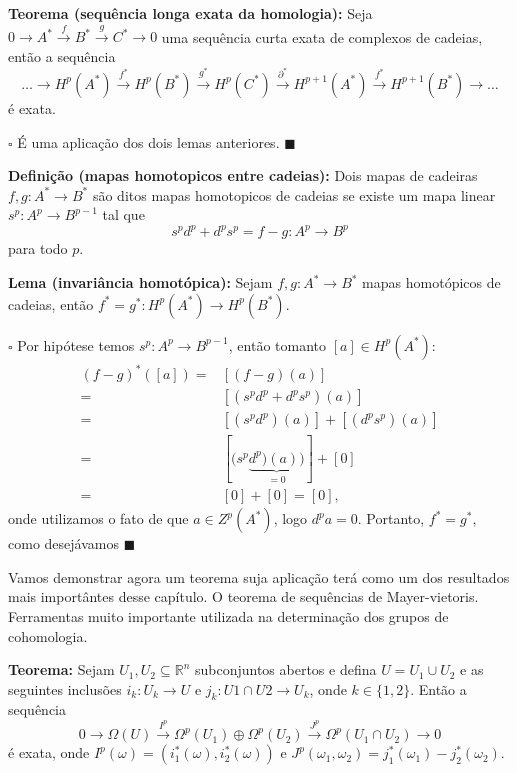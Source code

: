 \documentclass{article}
\begin{document}
	\textbf{Teorema (sequência longa exata da homologia):} Seja $0 \to A^{*} \xrightarrow{f} B^{*} \xrightarrow{g} C^{*} \to 0$ uma sequência curta exata de complexos de cadeias, então a sequência $$\dots \to H^{p}(A^{*}) \xrightarrow{f^{*}} H^{p}(B^{*}) \xrightarrow{g^{*}} H^{p}(C^{*}) \xrightarrow{\partial^{*}} H^{p+1}(A^{*}) \xrightarrow{f^{*}} H^{p+1}(B^{*}) \to \dots$$
	é exata.
	
	$\square$ É uma aplicação dos dois lemas anteriores. $\blacksquare$
	
	\textbf{Definição (mapas homotopicos entre cadeias):} Dois mapas de cadeiras $f,g : A^{*} \to B^{*}$ são ditos mapas homotopicos de cadeias se existe um mapa linear $s^{p}: A^{p} \to B^{p-1}$ tal que
	$$
	s^{p}d^{p} + d^{p}s^{p} = f-g : A^{p} \to B^{p}
	$$
	para todo $p$.
	
	\textbf{Lema (invariância homotópica):} Sejam $f,g : A^{*} \to B^{*}$ mapas homotópicos de cadeias, então $f^{*} = g^{*}: H^{p}(A^{*}) \to H^{p}(B^{*})$.
	
	$\square$ Por hipótese temos $s^{p}: A^{p} \to B^{p-1}$, então tomanto $[a] \in H^{p}(A^{*})$:
	$$
	\begin{aligned}
	(f-g)^{*}([a]) =& [(f-g)(a)]
	\\
	=& [(s^{p}d^{p} + d^{p}s^{p})(a)]
	\\
	=& [(s^{p}d^{p})(a)] + [(d^{p}s^{p})(a)]
	\\
	=& [(s^{p} \underbrace{d^{p})(a))}_{
		=0}] +[0]
	\\
	=& [0]+[0] = [0],
	\end{aligned}
	$$ 
	onde utilizamos o fato de que $a\in Z^{p}(A^{*})$, logo $d^{p}a = 0$. Portanto, $f^{*} = g^{*}$, como desejávamos $\blacksquare$
	
	Vamos demonstrar agora um teorema suja aplicação terá como um dos resultados mais importântes desse capítulo. O teorema de sequências de Mayer-vietoris. Ferramentas muito importante utilizada na determinação dos grupos de cohomologia.
	
	\textbf{Teorema:} Sejam $U_{1}, U_{2} \subseteq \mathbb{R}^{n}$ subconjuntos abertos e defina $U=U_{1} \cup U_{2}$ e as seguintes inclusões $i_{k}: U_{k} \to U$ e $j_{k}: U{1}\cap U{2} \to U_{k}$, onde $k \in \{1,2\}$. Então a sequência
	$$
	0 \to \Omega(U) \xrightarrow{I^{p}} \Omega^{p}(U_{1}) \oplus \Omega^{p}(U_{2}) \xrightarrow{J^{p}} \Omega^{p}(U_{1} \cap U_{2}) \to 0 
	$$
	é exata, onde $I^{p}(\omega) = (i^{*}_{1}(\omega), i^{*}_{2}(\omega))$ e $J^{p}(\omega_{1}, \omega_{2}) = j^{*}_{1}(\omega_{1})- j^{*}_{2}(\omega_{2})$.
	
\end{document}
